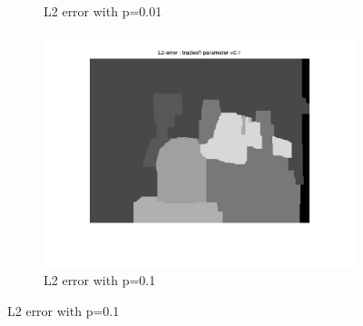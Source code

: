 \documentclass[fleqn]{article}
\begin{document}
\begin{figure}[!ht]
\begin{subfigure}{0.5\textwidth}
\caption{L2 error with p=0.01}
\end{subfigure}
 \begin{subfigure}{0.5\textwidth}
\includegraphics[scale=0.2]{./pics/tsukuba_L2_error_p=0.1.jpg}
\caption{L2 error with p=0.1}
\end{subfigure}
\end{figure}
\end{document}
